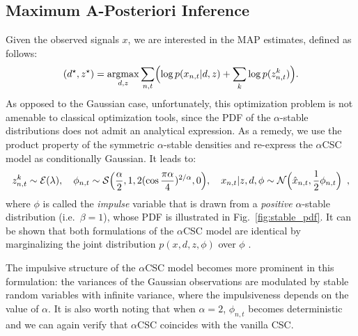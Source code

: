 \subsection{Maximum A-Posteriori Inference}
Given the observed signals $x$, we are interested in the MAP estimates, defined as follows:
\begin{align}
(d^\star,z^\star) = \mathop{\mathrm{argmax}}_{d,z}  \sum_{n,t} \Bigl( \log p(x_{n,t}|d,z) + \sum_k \log p(z_{n,t}^k)  \Bigr).
\end{align}
As opposed to the Gaussian case, unfortunately, this optimization problem is not amenable to classical optimization tools, since the PDF of the $\alpha$-stable distributions does not admit an analytical expression.  
%
As a remedy, we use the product property of the symmetric $\alpha$-stable densities \cite{samorodnitsky1994stable,godsill1999bayesian} and re-express the $\alpha$CSC model as conditionally Gaussian. It leads to:
\begin{align}
z_{n,t}^k \sim {\cal E}( \lambda),  \quad 
\phi_{n,t} \sim {\cal S}\Bigl(\frac{\alpha}{2},1, 2 (\cos \frac{\pi \alpha}{4})^{2/\alpha} ,0 \Bigr), \quad
x_{n,t} | z, d, \phi \sim {\cal N}\Bigl(\hat{x}_{n,t},\frac{1}{2}\phi_{n,t} \Bigr) \enspace ,
\label{eqn:sas_condgauss}
\end{align}
where $\phi$ is called the \emph{impulse} variable that is drawn from a \emph{positive} $\alpha$-stable distribution (i.e.\ $\beta =1$), whose PDF is illustrated in Fig.~\ref{fig:stable_pdf}. It can be shown that both formulations of the $\alpha$CSC model are identical by marginalizing the joint distribution $p(x,d,z,\phi)$ over $\phi$ \cite[Proposition 1.3.1]{samorodnitsky1994stable}. 

The impulsive structure of the $\alpha$CSC model becomes more prominent in this formulation: the variances of the Gaussian observations are modulated by stable random variables with infinite variance, where the impulsiveness depends on the value of $\alpha$. 
%
It is also worth noting that when $\alpha = 2$, $\phi_{n,t}$ becomes deterministic and we can again verify that $\alpha$CSC coincides with the vanilla CSC. 


